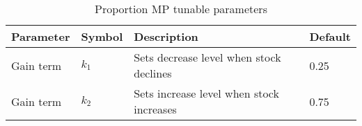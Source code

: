 \begin{table}[h]
\centering
\caption{Proportion MP tunable parameters}
\begin{tabular}{p{3cm}p{1.2cm}p{6cm}p{2cm}} 
  \hline
  Parameter & Symbol & Description & Default \\ 
  \hline
  Gain term & $k_1$ & Sets decrease level when stock declines  & 0.25\\
  Gain term & $k_2$ & Sets increase level when stock increases   & 0.75\\
  \hline
\end{tabular}
\end{table}
